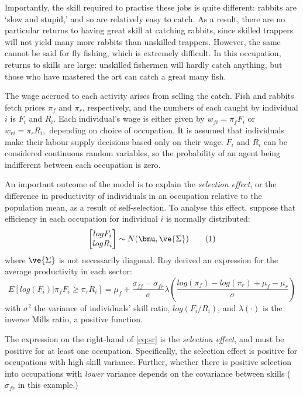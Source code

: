 \message{ !name(paper.tex)}\documentclass[a4paper,11pt]{report}
\numberwithin{equation}{chapter}
\begin{document}
Importantly, the skill required to practise these jobs is quite different: rabbits are `slow and stupid,' and so are relatively easy to catch. As a result, there are no particular returns to having great skill at catching rabbits, since skilled trappers will not yield many more rabbits than unskilled trappers. However, the same cannot be said for fly fishing, which is extremely difficult. In this occupation, returns to skills are large: unskilled fishermen will hardly catch anything, but those who have mastered the art can catch a great many fish.

The wage accrued to each activity arises from selling the catch. Fish and rabbits fetch prices $\pi_f$ and $\pi_r$, respectively, and the numbers of each caught by individual $i$ is $F_i$ and $R_i$. Each individual's wage is either given by $w_{fi} = \pi_fF_i$ or $w_{ri}=\pi_rR_i,$ depending on choice of occupation. It is assumed that individuals make their labour supply decisions based only on their wage. $F_i$ and $R_i$ can be considered continuous random variables, so the probability of an agent being indifferent between each occupation is zero.

An important outcome of the model is to explain the {\em selection effect}, or the difference in productivity of individuals in an occupation relative to the population mean, as a result of self-selection. To analyse this effect, suppose that efficiency in each occupation for individual $i$ is normally distributed:
\begin{equation}
 \begin{bmatrix}log{F_i} \\ log{R_i}\end{bmatrix} \sim N(\bmu, \ve{\Sigma}) 
 \label{eq:dist}\tag{1}
\end{equation}
where $\ve{\Sigma}$ is not necessarily diagonal. Roy derived an expression for the average productivity in each sector:
\begin{equation}
 E\left[ log(F_i) | \pi_fF_i \geq \pi_rR_i \right]
   = \mu_f + \frac{\sigma_{ff} - \sigma_{fr}}{\sigma}
     \lambda\left(
       \frac{log(\pi_f) - log(\pi_r) + \mu_f - \mu_r}{\sigma}
       \right)
\label{eq:sr}\tag{2}
\end{equation}
with $\sigma^2$ the variance of individuals' skill ratio, $log(F_i/R_i)$, and $\lambda(\cdot)$ is the inverse Mills ratio, a positive function. 

The expression on the right-hand of \eqref{eq:sr} is the {\em selection effect}, and must be positive for at least one occupation. Specifically, the selection effect is positive for occupations with high skill variance. Further, whether there is positive selection into occupations with {\em lower} variance depends on the covariance between skills ($\sigma_{fr}$ in this example.)
\end{document}
